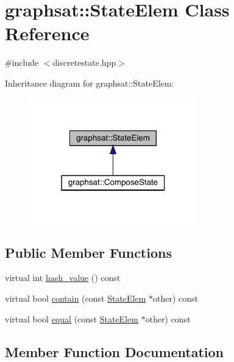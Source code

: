 \hypertarget{classgraphsat_1_1_state_elem}{}\section{graphsat\+::State\+Elem Class Reference}
\label{classgraphsat_1_1_state_elem}


{\ttfamily \#include $<$discretestate.\+hpp$>$}



Inheritance diagram for graphsat\+::State\+Elem\+:\nopagebreak
\begin{figure}[H]
\begin{center}
\leavevmode
\includegraphics[width=207pt]{classgraphsat_1_1_state_elem__inherit__graph}
\end{center}
\end{figure}
\subsection*{Public Member Functions}
\begin{DoxyCompactItemize}
\item 
virtual int \mbox{\hyperlink{classgraphsat_1_1_state_elem_a62c95e1989edf61e695f17709d84d626}{hash\+\_\+value}} () const
\item 
virtual bool \mbox{\hyperlink{classgraphsat_1_1_state_elem_a9f05de6c6926420c7ba4a79f0fab956f}{contain}} (const \mbox{\hyperlink{classgraphsat_1_1_state_elem}{State\+Elem}} $\ast$other) const
\item 
virtual bool \mbox{\hyperlink{classgraphsat_1_1_state_elem_a96f98a1a836950bec46b03269defd823}{equal}} (const \mbox{\hyperlink{classgraphsat_1_1_state_elem}{State\+Elem}} $\ast$other) const
\end{DoxyCompactItemize}


\subsection{Member Function Documentation}
\mbox{\label{classgraphsat_1_1_state_elem_a9f05de6c6926420c7ba4a79f0fab956f}} 
